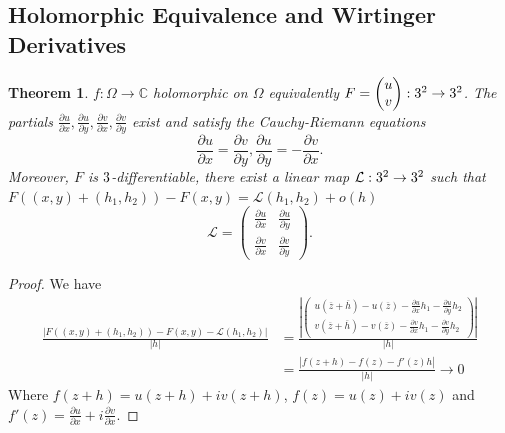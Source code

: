 \documentclass[a4paper]{article}
\newtheorem{thm}{Theorem}[section]
\begin{document}
\subsection{Holomorphic Equivalence and Wirtinger Derivatives}
\begin{thm}
    $f:\Omega\to \mathbb{C}$ holomorphic on $\Omega$ equivalently $F=\begin{pmatrix}
        {u} \\ 
        {v}
    \end{pmatrix}:3^2\to 3^2$. The partials $\frac{\partial u}{\partial x}, \frac{\partial u}{\partial y}, \frac{\partial v}{\partial x}, \frac{\partial v}{\partial y}$ exist and satisfy the Cauchy-Riemann equations \[
    \frac{\partial u}{\partial x}=\frac{\partial v}{\partial y}, \frac{\partial u}{\partial y}=-\frac{\partial v}{\partial x}
    .\] 
    Moreover, $F$ is $3$-differentiable, there exist a linear map $\mathcal{L}:3^2\to3^2$ such that $F((x,y)+(h_1,h_2))-F(x,y)=\mathcal{L}(h_1,h_2)+o(h)$ \[
    \mathcal{L}=\begin{pmatrix}
        {\frac{\partial u}{\partial x}} & {\frac{\partial u}{\partial y}} \\ 
        {\frac{\partial v}{\partial x}} & {\frac{\partial v}{\partial y}}
    \end{pmatrix}
    .\]  
\end{thm}
\begin{proof}
    We have 
    \begin{align}
        \frac{|F((x,y)+(h_1,h_2))-F(x,y)-\mathcal{L}(h_1,h_2)|}{|h|}&=\frac{\left | \begin{pmatrix}
            {u(\overline{z}+\overline{h})-u(\overline{z})-\frac{\partial u}{\partial x}h_1-\frac{\partial u}{\partial y}h_2} \\ 
            {v(\overline{z}+\overline{h})-v(\overline{z})-\frac{\partial v}{\partial x}h_1-\frac{\partial v}{\partial y}h_2}
        \end{pmatrix}\right |}{|h|}\\
        &=\frac{|f(z+h)-f(z)-f'(z)h|}{|h|}\to 0
    \end{align}
    Where $f(z+h)=u(z+h)+iv(z+h)$, $f(z)=u(z)+iv(z)$ and $f'(z)=\frac{\partial u }{\partial x}+i \frac{\partial v }{\partial x}$.
\end{proof}
\end{document}
